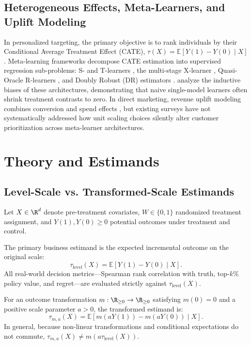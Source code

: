\documentclass[11pt,a4paper]{article}
\newcommand{\taulevel}{\tau_{\text{level}}}
\newcommand{\tauma}{\tau_{m, a}}
\newcommand{\E}{\mathbb{E}}
\begin{document}
\subsection{Heterogeneous Effects, Meta-Learners, and Uplift Modeling}
In personalized targeting, the primary objective is to rank individuals by their Conditional Average Treatment Effect (CATE), $\tau(X) = \E[Y(1) - Y(0) \mid X]$. Meta-learning frameworks decompose CATE estimation into supervised regression sub-problems: S- and T-learners \citep{kunzel2019metalearners}, the multi-stage X-learner \citep{kunzel2019metalearners}, Quasi-Oracle R-learners \citep{nie2021quasioracle}, and Doubly Robust (DR) estimators \citep{kennedy2023towards}. \cite{curth2021nonparametric} analyze the inductive biases of these architectures, demonstrating that naive single-model learners often shrink treatment contrasts to zero. In direct marketing, revenue uplift modeling combines conversion and spend effects \citep{gubela2020response, baier2022profit, he2024rankability}, but existing surveys \citep{gutierrez2017uplift, zhang2022unified} have not systematically addressed how unit scaling choices silently alter customer prioritization across meta-learner architectures.

\section{Theory and Estimands}
\label{sec:theory}

\subsection{Level-Scale vs. Transformed-Scale Estimands}
Let $X \in \R^d$ denote pre-treatment covariates, $W \in \{0, 1\}$ randomized treatment assignment, and $Y(1), Y(0) \ge 0$ potential outcomes under treatment and control.

\begin{definition}
The primary business estimand is the expected incremental outcome on the original scale:
\begin{equation}
\taulevel(X) = \E[Y(1) - Y(0) \mid X].
\end{equation}
All real-world decision metrics---Spearman rank correlation with truth, top-$k\%$ policy value, and regret---are evaluated strictly against $\taulevel(X)$.
\end{definition}

\begin{definition}
For an outcome transformation $m: \R_{\ge 0} \to \R_{\ge 0}$ satisfying $m(0)=0$ and a positive scale parameter $a > 0$, the transformed estimand is:
\begin{equation}
\tauma(X) = \E[m(aY(1)) - m(aY(0)) \mid X].
\end{equation}
In general, because non-linear transformations and conditional expectations do not commute, $\tauma(X) \neq m(a\taulevel(X))$.
\end{definition}
\end{document}
